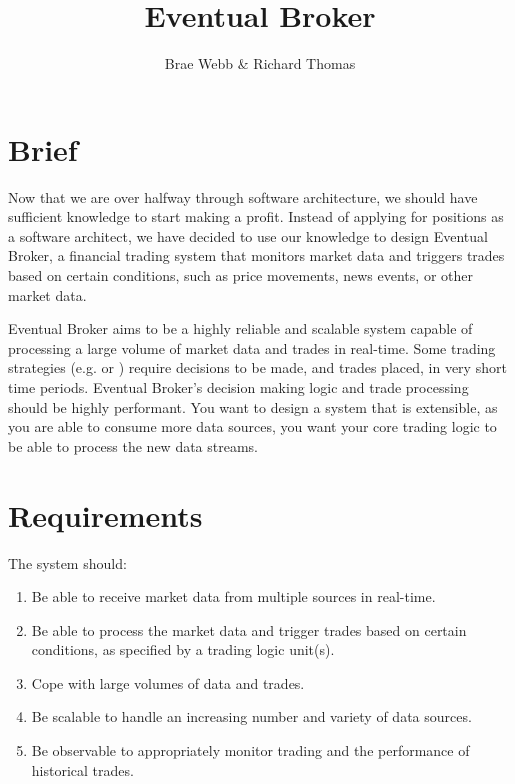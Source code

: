 \documentclass{csse4400}
\title{Eventual Broker}
\author{Brae Webb \& Richard Thomas}
\date{\week[tutorial]{7}}
\begin{document}
\maketitle

\section{Brief}

Now that we are over halfway through software architecture,
we should have sufficient knowledge to start making a profit.
Instead of applying for positions as a software architect,
we have decided to use our knowledge to design Eventual Broker,
a financial trading system that monitors market data and triggers trades based on certain conditions,
such as price movements, news events, or other market data.

Eventual Broker aims to be a highly reliable and scalable system capable of processing a large volume of market data and trades in real-time.
Some trading strategies (e.g. 
or )
require decisions to be made, and trades placed, in very short time periods.
Eventual Broker's decision making logic and trade processing should be highly performant.
You want to design a system that is extensible,
as you are able to consume more data sources,
you want your core trading logic to be able to process the new data streams.

\section{Requirements}

The system should:
\begin{enumerate}
\item Be able to receive market data from multiple sources in real-time.
\item Be able to process the market data and trigger trades based on certain conditions, as specified by a trading logic unit(s).
\item Cope with large volumes of data and trades.
\item Be scalable to handle an increasing number and variety of data sources.
\item Be observable to appropriately monitor trading and the performance of historical trades.
\end{enumerate}
\end{document}
